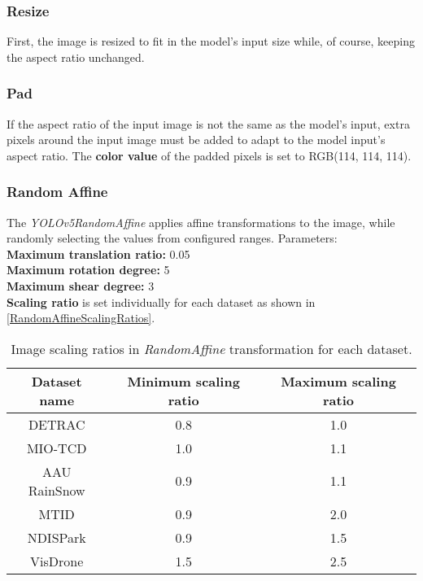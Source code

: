 \subsubsection*{Resize}

First, the image is resized to fit in the model's input size while, of course,
keeping the aspect ratio unchanged.

\subsubsection*{Pad}

\label{PadTransformation}
If the aspect ratio of the input image is not the same as the model's input, extra pixels around the input image must be added
to adapt to the model input's aspect ratio. The \textbf{color value} of the padded pixels is set to RGB(114, 114, 114).

\subsubsection*{Random Affine}

The \textit{YOLOv5RandomAffine} applies affine transformations to the image,
while randomly selecting the values from configured ranges. Parameters:\\
\textbf{Maximum translation ratio:} 0.05 \\
\textbf{Maximum rotation degree:} 5 \\
\textbf{Maximum shear degree:} 3 \\
\textbf{Scaling ratio} is set individually for each dataset as shown in \autoref{RandomAffineScalingRatios}.

\begin{table}[h]
\centering
\begin{tabular}{|c|c|c|}
    \hline
    Dataset name & Minimum scaling ratio & Maximum scaling ratio \\
    \hline
    DETRAC       & 0.8 & 1.0 \\
    MIO-TCD      & 1.0 & 1.1 \\
    AAU RainSnow & 0.9 & 1.1 \\
    MTID         & 0.9 & 2.0 \\
    NDISPark     & 0.9 & 1.5 \\
    VisDrone     & 1.5 & 2.5 \\
    \hline
\end{tabular}
\caption{Image scaling ratios in \textit{RandomAffine} transformation for each dataset.}
\label{RandomAffineScalingRatios}
\end{table}

